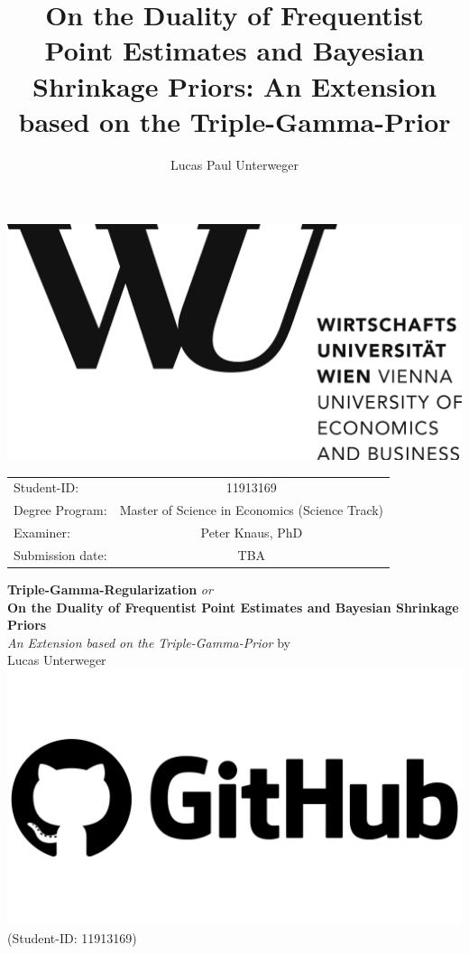 \documentclass[12pt,a4paper]{article}
\author{Lucas Paul Unterweger}
\title{On the Duality of Frequentist Point Estimates and Bayesian Shrinkage Priors: An Extension based on the Triple-Gamma-Prior}
\begin{document}
\begin{titlepage}
\center
\vfill
\includegraphics[scale=0.1]{WU.png}
\vfill
\begin{tabular}[t]{lc}
Student-ID:  & 11913169 \\
Degree Program: & 
Master of Science in Economics (Science Track) \\
Examiner: & Peter Knaus, PhD \\
Submission date: & TBA \\
\end{tabular}
\vfill
{\large \textbf{Triple-Gamma-Regularization} \textit{or}\\ \textbf{On the Duality of Frequentist Point Estimates and Bayesian Shrinkage Priors}\\
\normalsize \textit{An Extension based on the Triple-Gamma-Prior}}
\vfill
by\\ \vspace{3mm}
{\Large Lucas Unterweger \href{https://github.com/therealLucasPaul}{\includegraphics[scale=0.01]{GitHub.png}}}\\
(Student-ID: 11913169)\\
\vfill

\thispagestyle{empty}
\pagebreak
\end{titlepage}
\thispagestyle{empty}
\end{document}

